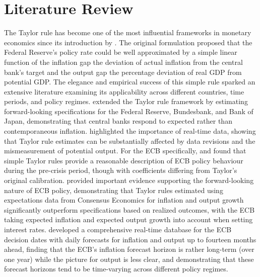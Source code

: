 \section{Literature Review}\label{sec:litreview}
\par The Taylor rule has become one of the most influential frameworks in monetary economics since its introduction by \cite{taylor1993discretion}. The original formulation proposed that the Federal Reserve's policy rate could be well approximated by a simple linear function of the inflation gap the deviation of actual inflation from the central bank's target and the output gap the percentage deviation of real GDP from potential GDP. The elegance and empirical success of this simple rule sparked an extensive literature examining its applicability across different countries, time periods, and policy regimes. \cite{clarida2000monetary} extended the Taylor rule framework by estimating forward-looking specifications for the Federal Reserve, Bundesbank, and Bank of Japan, demonstrating that central banks respond to expected rather than contemporaneous inflation. \cite{orphanides2001monetary} highlighted the importance of real-time data, showing that Taylor rule estimates can be substantially affected by data revisions and the mismeasurement of potential output. For the ECB specifically, \cite{gerdesmeier2004taylor} and \cite{fendel2009inflation} found that simple Taylor rules provide a reasonable description of ECB policy behaviour during the pre-crisis period, though with coefficients differing from Taylor's original calibration. \cite{gorter2008taylor} provided important evidence supporting the forward-looking nature of ECB policy, demonstrating that Taylor rules estimated using expectations data from Consensus Economics for inflation and output growth significantly outperform specifications based on realized outcomes, with the ECB taking expected inflation and expected output growth into account when setting interest rates. \cite{klose2023estimated} developed a comprehensive real-time database for the ECB decision dates with daily forecasts for inflation and output up to fourteen months ahead, finding that the ECB's inflation forecast horizon is rather long-term (over one year) while the picture for output is less clear, and demonstrating that these forecast horizons tend to be time-varying across different policy regimes.
